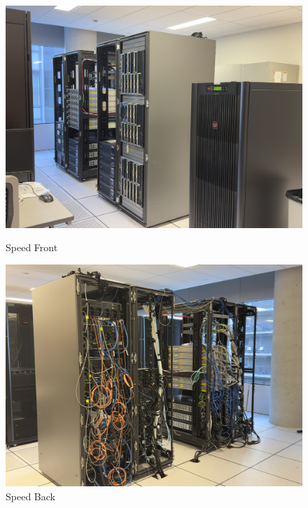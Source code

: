 \begin{figure}[htbp]
    \centering
    \begin{minipage}[b]{0.49\columnwidth}
        \centering
        \includegraphics[width=\linewidth]{images/speed2.jpg}
        \caption{Speed Front}
        \label{fig:speed-front}
    \end{minipage}
    \hfill
    \begin{minipage}[b]{0.49\columnwidth}
        \centering
        \includegraphics[width=\linewidth]{images/speed1.jpg}
        \caption{Speed Back}
        \label{fig:speed-back}
    \end{minipage}
\end{figure}

